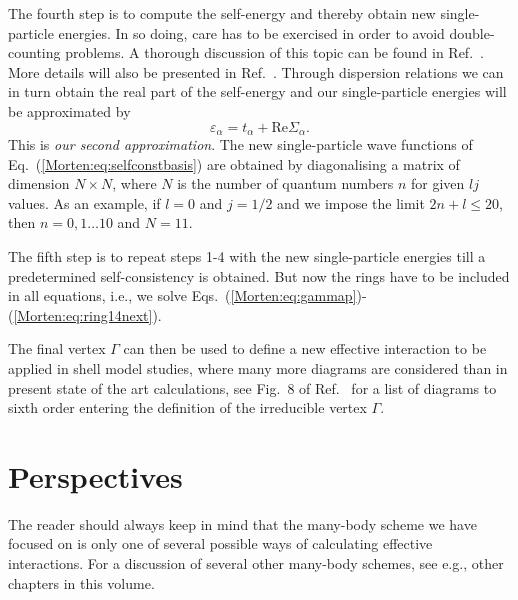 The fourth step is to compute the self-energy and thereby obtain
new single-particle energies. In so doing, care has to be exercised
in order to avoid double-counting problems. A thorough discussion
of this topic can be found in Ref.~. More details
will also be presented in Ref.~.
Through dispersion relations \cite{Morten:rpd89} we can in turn obtain
the real part of the self-energy and our single-particle energies
will be approximated by
\begin{equation}
  \varepsilon_{\alpha}=t_{\alpha}+\mathrm{Re}\Sigma_{\alpha}.
\end{equation}
This is {\em our second approximation}.
The new single-particle wave functions of 
Eq.~(\ref{Morten:eq:selfconstbasis}) are obtained
by diagonalising a matrix of dimension 
$N\times N$, where $N$ is the number of quantum
numbers $n$ for given $lj$ values. As an example, if $l=0$ and
$j=1/2$ and we impose the limit $2n+l \leq 20$, then $n=0,1\dots 10$
and $N=11$. 

The fifth step is to repeat steps 1-4 with the new single-particle
energies till a predetermined self-consistency is obtained. 
But now the rings have to be included in all equations, i.e.,
we solve Eqs.~(\ref{Morten:eq:gammap})-(\ref{Morten:eq:ring14next}). 

The final vertex $\Gamma$ can then be used to define a 
new effective interaction to be applied in shell model studies,
where many more diagrams are considered than in present 
state of the art calculations, see Fig.~8 of Ref.~
for a list of diagrams to sixth order entering the definition
of  the irreducible vertex $\Gamma$.

\section{Perspectives}

\label{Morten:sec:sec6}

The reader should always 
keep in mind that the many-body scheme we have focused on 
is only one of several
possible ways of calculating effective interactions. 
For a discussion of several other many-body schemes,
see e.g., other chapters in this volume.

